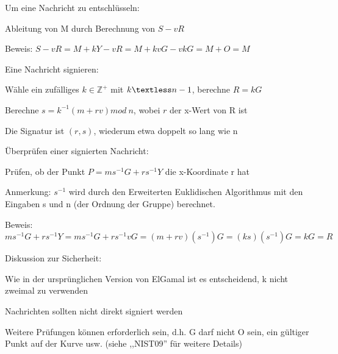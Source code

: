 \documentclass[a4paper]{article}
\begin{document}
\begin{multicols}{3}
\begin{itemize*}
\begin{itemize*}
            \end{itemize*}
            \item Um eine Nachricht zu entschlüsseln:
            \begin{itemize*}
                  \item Ableitung von M durch Berechnung von $S-vR$
                  \item Beweis: $S-vR=M+kY-vR =M+kvG-vkG= M+O= M$
            \end{itemize*}
            \item Eine Nachricht signieren:
            \begin{itemize*}
                  \item Wähle ein zufälliges $k\in\mathbb{Z}^+$ mit $k\textless n-1$, berechne $R = kG$
                  \item Berechne $s=k^{-1}(m+rv) mod\ n$, wobei $r$ der x-Wert von R ist
                  \item Die Signatur ist $(r,s)$, wiederum etwa doppelt so lang wie n
            \end{itemize*}
            \item Überprüfen einer signierten Nachricht:
            \begin{itemize*}
                  \item Prüfen, ob der Punkt $P=ms^{-1}G+rs^{-1}Y$ die x-Koordinate r hat
                  \item Anmerkung: $s^{-1}$ wird durch den Erweiterten Euklidischen Algorithmus mit den Eingaben s und n (der Ordnung der Gruppe) berechnet.
                  \item Beweis: $ms^{-1}G+rs^{-1}Y = ms^{-1}G+rs^{-1}vG = (m+rv)(s^{-1})G = (ks)(s^{-1})G = kG = R$
            \end{itemize*}
            \item Diskussion zur Sicherheit:
            \begin{itemize*}
                  \item Wie in der ursprünglichen Version von ElGamal ist es entscheidend, k nicht zweimal zu verwenden
                  \item Nachrichten sollten nicht direkt signiert werden
                  \item Weitere Prüfungen können erforderlich sein, d.h. G darf nicht O sein, ein gültiger Punkt auf der Kurve usw. (siehe ,,NIST09'' für weitere Details)
            \end{itemize*}
      \end{itemize*}


\end{multicols}
\end{document}

